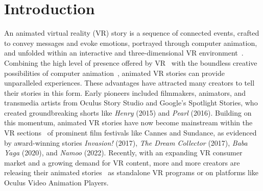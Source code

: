 \section{Introduction}
An animated virtual reality (VR) story is a sequence of connected events, crafted to convey messages and evoke emotions, portrayed through computer animation, and unfolded within an interactive and three-dimensional VR environment~\cite{franklin2021fairy,cutler2019making,dooley2021cinematic, bosworth2018craftingVRstory}. 
Combining the high level of presence offered by VR~\cite{bindman2018bunny} with the boundless creative possibilities of computer animation~\cite{cutler2019making}, animated VR stories can provide unparalleled experiences.
These advantages have attracted many creators to tell their stories in this form. 
Early pioneers included filmmakers, animators, and transmedia artists from Oculus Story Studio and Google's Spotlight Stories, who created groundbreaking shorts like \textit{Henry} (2015) and \textit{Pearl} (2016). Building on this momentum, animated VR stories have now become mainstream within the VR sections~\cite{bosworth2018craftingVRstory} of prominent film festivals \cite{CannesAward} like Cannes and Sundance, as evidenced by award-winning stories \textit{Invasion!} (2017), \textit{The Dream Collector} (2017), \textit{Baba Yaga} (2020), and \textit{Namoo} (2022). 
Recently, with an expanding VR consumer market and a growing demand for VR content, more and more creators are releasing their animated stories~\cite{CannesAward} as standalone VR programs or on platforms like Oculus Video Animation Players.

